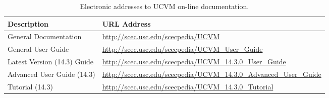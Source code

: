 
\begin{table*}
\centering
\small
\caption{Electronic addresses to UCVM on-line documentation.}
\begin{tabular}[]{ll}
\\
Description                 & URL Address                                                         \\
\hline
General Documentation       & \url{http://scec.usc.edu/scecpedia/UCVM}                            \\
General User Guide          & \url{http://scec.usc.edu/scecpedia/UCVM_User_Guide}                 \\
Latest Version (14.3) Guide & \url{http://scec.usc.edu/scecpedia/UCVM_14.3.0_User_Guide}          \\
Advanced User Guide (14.3)  & \url{http://scec.usc.edu/scecpedia/UCVM_14.3.0_Advanced_User_Guide} \\
Tutorial (14.3)             & \url{http://scec.usc.edu/scecpedia/UCVM_14.3.0_Tutorial}            \\
\hline
\end{tabular}
\label{tab:manuals}
\end{table*}
